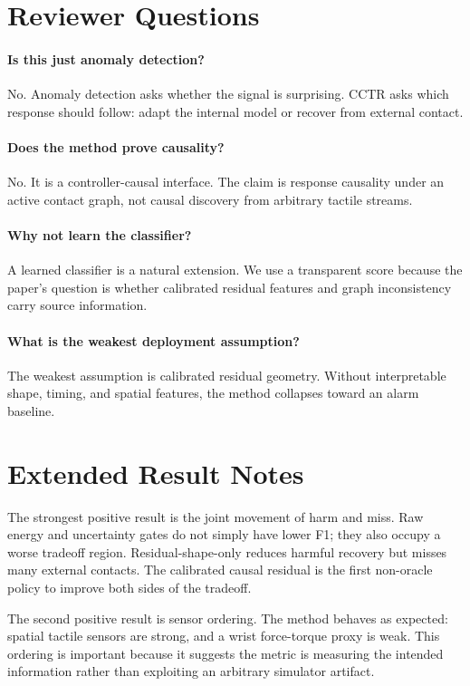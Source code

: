 \documentclass{article}
\newcommand{\method}{CCTR}
\begin{document}
\section{Reviewer Questions}

\paragraph{Is this just anomaly detection?}
No. Anomaly detection asks whether the signal is surprising. \method{} asks which response should follow: adapt the internal model or recover from external contact.

\paragraph{Does the method prove causality?}
No. It is a controller-causal interface. The claim is response causality under an active contact graph, not causal discovery from arbitrary tactile streams.

\paragraph{Why not learn the classifier?}
A learned classifier is a natural extension. We use a transparent score because the paper's question is whether calibrated residual features and graph inconsistency carry source information.

\paragraph{What is the weakest deployment assumption?}
The weakest assumption is calibrated residual geometry. Without interpretable shape, timing, and spatial features, the method collapses toward an alarm baseline.

\section{Extended Result Notes}

The strongest positive result is the joint movement of harm and miss. Raw energy and uncertainty gates do not simply have lower F1; they also occupy a worse tradeoff region. Residual-shape-only reduces harmful recovery but misses many external contacts. The calibrated causal residual is the first non-oracle policy to improve both sides of the tradeoff.

The second positive result is sensor ordering. The method behaves as expected: spatial tactile sensors are strong, and a wrist force-torque proxy is weak. This ordering is important because it suggests the metric is measuring the intended information rather than exploiting an arbitrary simulator artifact.
\end{document}
